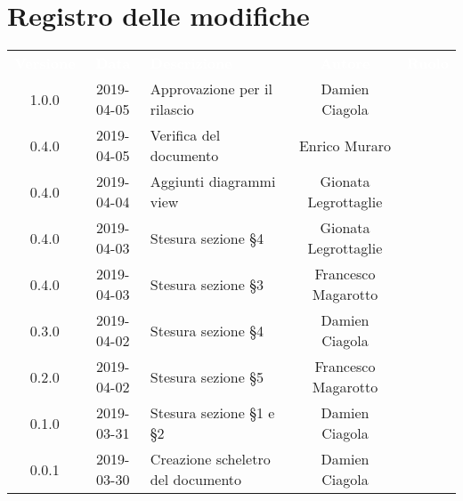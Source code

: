 \section*{Registro delle modifiche}
{
	\renewcommand{\arraystretch}{1.5}
	\centering
	\begin{longtable}{ c c C{6cm} c c }
		\textcolor{white}{\textbf{Versione}} & \textcolor{white}{\textbf{Data}} & \textcolor{white}{\textbf{Descrizione}} & \textcolor{white}{\textbf{Autore}} & \textcolor{white}{\textbf{Ruolo}}\\

		1.0.0 & 
		2019-04-05 &  
		Approvazione per il rilascio &	
		Damien Ciagola &
		\RdP{}  \\	

		0.4.0 & 
		2019-04-05 &  
		Verifica del documento &	
		Enrico Muraro &
		\ver{}  \\			
		
		0.4.0 & 
		2019-04-04 &  
		Aggiunti diagrammi view &	
		Gionata Legrottaglie&
		\reda{}  \\			
		
		0.4.0 & 
		2019-04-03 &  
		Stesura sezione §4 &	
		Gionata Legrottaglie&
		\reda{}  \\			
		
		0.4.0 & 
		2019-04-03 &  
		Stesura sezione §3 &	
		Francesco Magarotto &
		\reda{}  \\			
		
		0.3.0 & 
		2019-04-02 &  
		Stesura sezione §4 &	
		Damien Ciagola &
		\reda{}  \\		
		
		0.2.0 & 
		2019-04-02 &  
		Stesura sezione §5 &	
		Francesco Magarotto &
		\reda{}  \\	
		
		0.1.0 & 
		2019-03-31 &  
		Stesura sezione §1 e §2 &	
		Damien Ciagola &
		\reda{}  \\
		
		0.0.1 & 
		2019-03-30 &  
		Creazione scheletro del documento&	
		Damien Ciagola  &	
		\reda{}  \\
	\end{longtable}

}